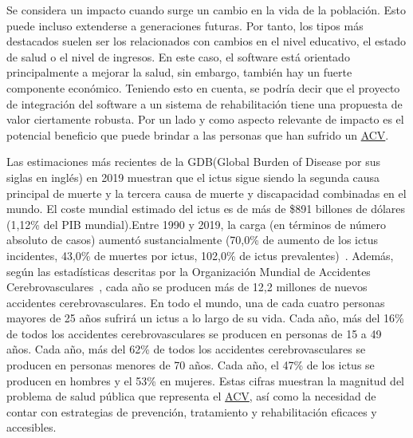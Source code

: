 
Se considera un impacto cuando surge un cambio en la vida de la población. Esto puede incluso extenderse a generaciones futuras. Por tanto, los tipos más destacados suelen ser los relacionados con cambios en el nivel educativo, el estado de salud o el nivel de ingresos. En este caso, el software está orientado principalmente a mejorar la salud, sin embargo, también hay un fuerte componente económico. Teniendo esto en cuenta, se podría decir que el proyecto de integración del software a un sistema de rehabilitación tiene una propuesta de valor ciertamente robusta. Por un lado y como aspecto relevante de impacto es el potencial beneficio que puede brindar a las personas que han sufrido un \hyperlink{page: abbidx}{ACV}. 

Las estimaciones más recientes de la GDB(Global Burden of Disease por sus siglas en inglés) en 2019 muestran que el ictus sigue siendo la segunda causa principal de muerte y la tercera causa de muerte y discapacidad combinadas en el mundo. El coste mundial estimado del ictus es de más de \$891 billones de dólares (1,12\% del PIB mundial).Entre 1990 y 2019, la carga (en términos de número absoluto de casos) aumentó sustancialmente (70,0\% de aumento de los ictus incidentes, 43,0\% de muertes por ictus, 102,0\% de ictus prevalentes)~\cite{feigin2022world}. Además, según las estadísticas descritas por la Organización Mundial de Accidentes Cerebrovasculares~\cite{lindsay2019world}, cada año se producen más de 12,2 millones de nuevos accidentes cerebrovasculares. En todo el mundo, una de cada cuatro personas mayores de 25 años sufrirá un ictus a lo largo de su vida. Cada año, más del 16\% de todos los accidentes cerebrovasculares se producen en personas de 15 a 49 años. Cada año, más del 62\% de todos los accidentes cerebrovasculares se producen en personas menores de 70 años. Cada año, el 47\% de los ictus se producen en hombres y el 53\% en mujeres. Estas cifras muestran la magnitud del problema de salud pública que representa el \hyperlink{page: abbidx}{ACV}, así como la necesidad de contar con estrategias de prevención, tratamiento y rehabilitación eficaces y accesibles. 

